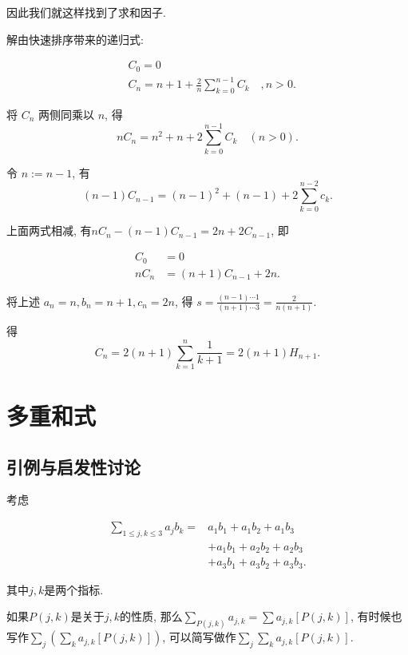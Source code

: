 \documentclass{ctexart}
\begin{document}
因此我们就这样找到了求和因子.

\begin{example}
	解由快速排序带来的递归式:

	$$
		\begin{aligned}
			 & C_0=0                                                 \\
			 & C_n=n+1+\frac{2}{n} \sum_{k=0}^{n-1} C_k \quad, n>0 .
		\end{aligned}
	$$

	将 $C_n$ 两侧同乘以 $n$, 得
	$$
		n C_n=n^2+n+2 \sum_{k=0}^{n-1} C_k \quad(n>0).
	$$

	令 $n:=n-1$, 有 $$
		(n-1) C_{n-1}=(n-1)^2+(n-1)+2 \sum_{k=0}^{n-2} c_k.
	$$

	上面两式相减, 有$n C_n-(n-1) C_{n-1}=2 n+2 C_{n-1}$, 即

	$$
		\begin{aligned}
			C_0   & =0                   \\
			n C_n & =(n+1) C_{n-1}+2 n .
		\end{aligned}
	$$

	将上述 $a_n=n, b_n=n+1, c_n=2 n$, 得 $s=\frac{(n-1) \cdots 1}{(n+1) \cdots 3}=\frac{2}{n(n+1)}$.

	得
	$$
		C_n=2(n+1) \sum_{k=1}^n \frac{1}{k+1}=2(n+1) H_{n+1}.
	$$

\end{example}

\newpage
\section{多重和式}

\subsection{引例与启发性讨论} 考虑

$$
	\begin{aligned}
		\sum_{1 \leqslant j, k \leqslant 3} a_j b_k= & a_1 b_1+a_1 b_2+a_1 b_3    \\
		                                             & +a_1 b_1+a_2 b_2+a_2 b_3   \\
		                                             & +a_3 b_1+a_3 b_2+a_3 b_3 .
	\end{aligned}
$$

其中$j,k$是两个指标.

如果$P(j,k)$是关于$j,k$的性质, 那么$\sum_{P(j, k)} a_{j, k}=\sum a_{j, k}[P(j, k)]$, 有时候也写作$\sum_j\left(\sum_k a_{j, k}[P(j, k)]\right)$, 可以简写做作$\sum_j \sum_k a_{j, k}[P(j, k)]$.
\end{document}
